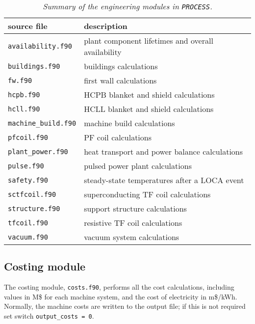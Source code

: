 \documentclass[11pt,a4paper]{report}
\newcommand{\process}{\mbox{\texttt{PROCESS}}}
\begin{document}
\begin{table}[tbph]
\begin{center}

\begin{tabular}{||l||l||} \hline
source file     & description \\ \hline
\texttt{availability.f90} & plant component lifetimes and overall availability \\
\texttt{buildings.f90} & buildings calculations \\
\texttt{fw.f90} & first wall calculations \\
\texttt{hcpb.f90} & HCPB blanket and shield calculations \\
\texttt{hcll.f90} & HCLL blanket and shield calculations \\
\texttt{machine\_build.f90} & machine build calculations \\
\texttt{pfcoil.f90} & PF coil calculations \\
\texttt{plant\_power.f90} & heat transport and power balance calculations \\
\texttt{pulse.f90} & pulsed power plant calculations \\
\texttt{safety.f90} & steady-state temperatures after a LOCA event \\
\texttt{sctfcoil.f90} & superconducting TF coil calculations \\
\texttt{structure.f90} & support structure calculations \\
\texttt{tfcoil.f90} & resistive TF coil calculations \\
\texttt{vacuum.f90} & vacuum system calculations \\
\hline
\end{tabular}
\end{center}
\caption[Summary of engineering modules]
{\label{tab:engineering}
  \textit{Summary of the engineering modules in \process.}
}
\end{table}

\subsection{Costing module}

The costing module, \texttt{costs.f90}, performs all the cost calculations,
including values in M\$ for each machine system, and the cost of electricity
in m\$/kWh. Normally, the machine costs are written to the output file; if
this is not required set switch \texttt{output\_costs = 0}.
\end{document}
